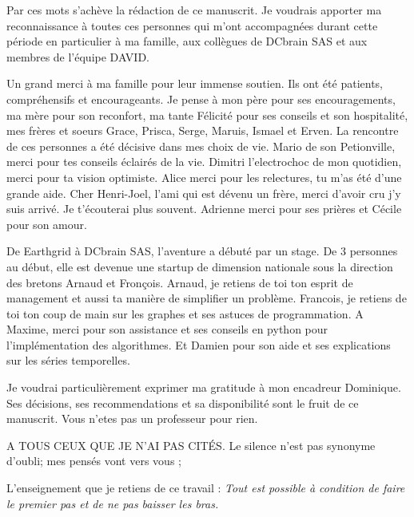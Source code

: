 

Par ces mots s'ach\`eve la r\'edaction de ce manuscrit.
Je voudrais apporter ma reconnaissance \`a toutes ces personnes qui m'ont accompagn\'ees durant cette p\'eriode en particulier \`a ma famille, aux coll\`egues de DCbrain SAS et aux membres de l'\'equipe DAVID.
\newline 

Un grand merci \`a ma famille pour leur immense soutien. Ils ont \'et\'e patients, compr\'ehensifs et encourageants. Je pense \`a mon p\`ere pour ses encouragements, ma m\`ere pour son reconfort, ma tante F\'elicit\'e pour ses conseils et son hospitalit\'e, mes fr\`eres et soeurs Grace, Prisca, Serge, Maruis, Ismael et Erven. 
\newline
La rencontre de ces personnes a \'et\'e d\'ecisive dans mes choix de vie. 
Mario de son Petionville, merci pour tes conseils \'eclair\'es de la vie.
Dimitri l'electrochoc de mon quotidien, merci pour ta vision optimiste. 
Alice merci pour les relectures, tu m'as \'et\'e d'une grande aide.
Cher Henri-Joel, l'ami qui est d\'evenu un fr\`ere, merci d'avoir cru j'y suis arriv\'e. Je t'\'ecouterai plus souvent.   
Adrienne merci pour ses pri\`eres et C\'ecile pour son amour.
\newline

De Earthgrid \`a DCbrain SAS, l'aventure a d\'ebut\'e par un stage. De $3$ personnes au d\'ebut, elle est devenue une startup de dimension nationale sous la direction des bretons Arnaud et Fron\c cois. 
Arnaud, je retiens de toi ton esprit de management et aussi ta mani\`ere de simplifier un probl\`eme.
Francois, je retiens  de toi ton  coup de main sur les graphes et ses astuces de programmation.
A Maxime, merci pour son assistance et ses conseils en python pour l'impl\'ementation des algorithmes.
Et Damien pour son aide et ses explications sur les s\'eries temporelles.
\newline

Je voudrai particuli\`erement exprimer ma gratitude \`a  mon encadreur Dominique. Ses d\'ecisions, ses recommendations et sa disponibilit\'e sont le fruit de ce manuscrit. 
Vous n'etes pas un professeur pour rien.
\newline

A TOUS CEUX QUE JE N'AI PAS CIT\'ES.
Le silence n'est pas synonyme d'oubli; mes pens\'es vont vers vous ;
\newline

L'enseignement que je retiens de ce travail : \newline
{\em Tout est possible \`a condition de faire le premier pas et de ne pas baisser les bras.}
